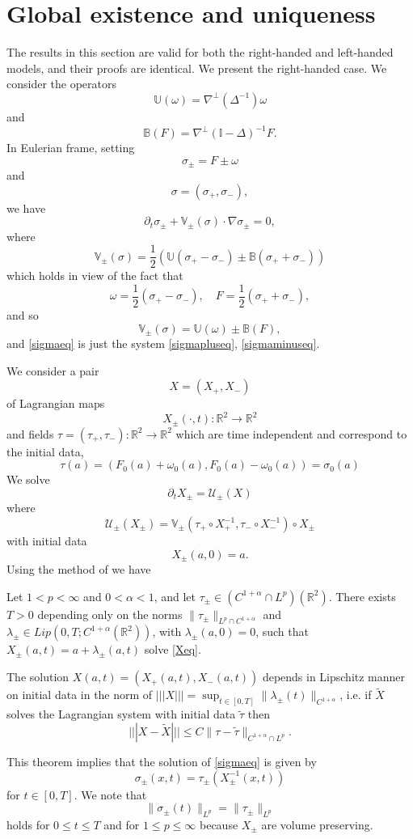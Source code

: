 \documentclass[11pt,reqno]{amsproc}
\newcommand{\pa}{\partial}
\newcommand{\la}{\label}
\newcommand{\fr}{\frac}
\newcommand{\na}{\nabla}
\newcommand{\be}{\begin{equation}}
\newcommand{\ee}{\end{equation}}
\newcommand{\Rr}{{\mathbb R}}
\newcommand{\beg}{\begin}
\newcommand{\D}{\Delta}
\begin{document}
 \section{Global existence and uniqueness}\la{globsmooth}
 The results in this section are valid for both the right-handed and left-handed models, and their proofs are identical.  We present the right-handed case. We consider the operators
 \be
 \mathbb U (\omega) = \na^{\perp}(\D^{-1})\omega
 \la{mathbbU}
 \ee
 and
 \be
 \mathbb B( F) = \na^{\perp}(\mathbb I - \D)^{-1}F.
 \la{mathbbB}
 \ee
 In Eulerian frame, setting
 \be
 \sigma_{\pm} = F\pm \omega
 \la{sigmapm}
 \ee
 and
 \be
 \sigma = (\sigma_+, \sigma_-),
 \la{sigma}
 \ee
 we have
 \be
 \pa_t \sigma_{\pm} + \mathbb V_{\pm}(\sigma)\cdot\na \sigma_{\pm} =0,
 \la{sigmaeq}
 \ee
 where 
 \be 
 \mathbb V_{\pm}(\sigma) = \fr{1}{2}\left (\mathbb U (\sigma_{+}-\sigma_{-}) \pm \mathbb B(\sigma_+ +\sigma_-)\right )
 \la{Vpm}
 \ee
 which holds in view of the fact that
 \be
 \omega = \fr{1}{2}(\sigma_{+}-\sigma_{-}), \quad F=  \fr{1}{2}(\sigma_{+}+\sigma_{-}),
 \la{omegaFsigmas}
 \ee
 and so
 \be
 \mathbb V_{\pm}(\sigma) = \mathbb U(\omega)\pm \mathbb B(F),
 \la{mathbbV}
 \ee
and \eqref{sigmaeq} is just the system \eqref{sigmapluseq}, \eqref{sigmaminuseq}.

 
 We consider a pair
 \be
 X= (X_+, X_-)
 \la{X}
 \ee
 of Lagrangian maps
 \be
 X_{\pm}(\cdot, t):\Rr^2\to\Rr^2
 \la{xpm}
 \ee
 and fields  $\tau = (\tau_+, \tau _-) :\Rr^2 \to \Rr^2$ which are time independent and correspond to the initial data,
 \be
 \tau (a) = (F_0(a) + \omega_0(a), F_0(a) - \omega_0(a) ) = \sigma_0(a)
 \la{taupm}
 \ee
 We solve
 \be
 \pa_t X_{\pm} = \mathcal U_{\pm}(X)
 \la{Xeq}
 \ee
 where 
 \be
 \mathcal U_{\pm}(X_{\pm}) = \mathbb V_{\pm} (\tau_+\circ X_{+}^{-1}, \tau_ -\circ X_-^{-1})\circ X_{\pm}
 \la{mathcalU}
 \ee
 with initial data
 \be
 X_{\pm}(a, 0) = a.
 \la{xid}
 \ee
 Using the method of \cite{hydro}
 we have
 \beg{thm} \label{thm:Calphalwp}
 Let $1<p<\infty$ and $0<\alpha<1$, and let $\tau_{\pm}\in (C^{1+\alpha}\cap L^p)(\Rr^2)$. There exists $T>0$ depending only on the norms $\|\tau_{\pm}\|_{L^p\cap C^{1+\alpha}}$ and 
 $\lambda_{\pm}\in Lip(0,T; C^{1+\alpha}(\Rr^2))$, with $\lambda_{\pm}(a,0) = 0$,  such that $X_{\pm}(a,t) = a + \lambda_{\pm}(a,t)$ solve
 \eqref{Xeq}.  
 
 The solution $X(a,t) = (X_+(a,t), X_-(a,t))$ depends in Lipschitz manner on initial data in the norm of $||| X ||| = \sup_{t\in[0,T]}\|\lambda_{\pm}(t) \|_{C^{1+\alpha}} $, i.e. if $\widetilde X$ solves the Lagrangian system with initial data $\widetilde\tau$ then
 \be
 ||| X- \widetilde X||| \le C\|\tau-\widetilde\tau\|_{C^{1+ \alpha}\cap L^p}.
 \ee
 \end{thm}
 This theorem implies that the solution of \eqref{sigmaeq} is given by
 \be
 \sigma_{\pm}(x,t) = \tau_{\pm}(X_{\pm}^{-1}(x,t))
 \la{sigmatau}
 \ee
 for $t\in [0,T]$. We note that 
 \be
 \|\sigma_{\pm}(t)\|_{L^p} = \|\tau_{\pm}\|_{L^p}
 \la{normp}
 \ee
 holds for $0\le t\le T$ and for $1\le p\le\infty$ because $X_{\pm}$ are volume preserving.
 
\end{document}
